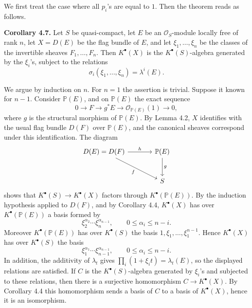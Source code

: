 \documentclass[11pt]{article}
\begin{document}
We first treat the case where all \(p_i\)'s are equal to \(1\). Then the theorem reads as follows.

\textbf{Corollary 4.7.} Let \(S\) be quasi-compact, let \(E\) be an \(\mathcal O_S\)-module locally free of rank \(n\), let \(X=D(E)\) be the flag bundle of \(E\), and let \(\xi_1,\ldots,\xi_n\) be the classes of the invertible sheaves \(F_1,\ldots,F_n\). Then \(K^\bullet(X)\) is the \(K^\bullet(S)\)-algebra generated by the \(\xi_i\)'s, subject to the relations
\[
  \sigma_i(\xi_1,\ldots,\xi_n)=\lambda^i(E).
\]

We argue by induction on \(n\). For \(n=1\) the assertion is trivial. Suppose it known for \(n-1\). Consider \(\mathbb P(E)\), and on \(\mathbb P(E)\) the exact sequence
\[
  0\longrightarrow F\longrightarrow g^*E\longrightarrow \mathcal O_{\mathbb P(E)}(1)\longrightarrow 0,
\]
where \(g\) is the structural morphism of \(\mathbb P(E)\). By Lemma 4.2, \(X\) identifies with the usual flag bundle \(D(F)\) over \(\mathbb P(E)\), and the canonical sheaves correspond under this identification. The diagram
\[
\begin{tikzcd}[column sep=large,row sep=large]
D(E)=D(F) \arrow[r,"h"] \arrow[dr,"f"'] & \mathbb P(E) \arrow[d,"g"]\\
& S
\end{tikzcd}
\]
shows that \(K^\bullet(S)\to K^\bullet(X)\) factors through \(K^\bullet(\mathbb P(E))\). By the induction hypothesis applied to \(D(F)\), and by Corollary 4.4, \(K^\bullet(X)\) has over \(K^\bullet(\mathbb P(E))\) a basis formed by
\[
  \xi_2^{\alpha_2}\cdots \xi_n^{\alpha_{n-1}},
  \qquad 0\leq \alpha_i\leq n-i.
\]
Moreover \(K^\bullet(\mathbb P(E))\) has over \(K^\bullet(S)\) the basis \(1,\xi_1,\ldots,\xi_1^{n-1}\). Hence \(K^\bullet(X)\) has over \(K^\bullet(S)\) the basis
\[
  \xi_1^{\alpha_1}\cdots \xi_{n-1}^{\alpha_{n-1}},
  \qquad 0\leq \alpha_i\leq n-i.
\]
In addition, the additivity of \(\lambda_t\) gives \(\prod_i(1+\xi_i t)=\lambda_t(E)\), so the displayed relations are satisfied. If \(C\) is the \(K^\bullet(S)\)-algebra generated by \(\xi_i\)'s and subjected to these relations, then there is a surjective homomorphism \(C\to K^\bullet(X)\). By Corollary 4.4 this homomorphism sends a basis of \(C\) to a basis of \(K^\bullet(X)\), hence it is an isomorphism.
\end{document}
